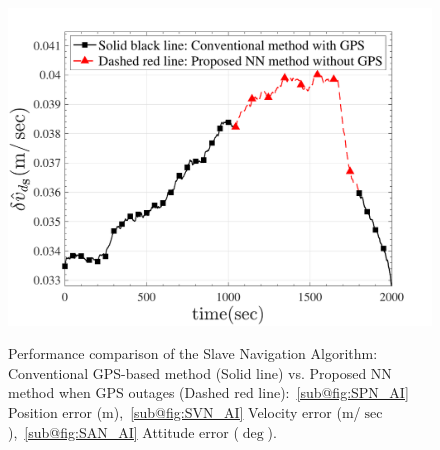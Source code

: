 \documentclass[3p]{elsarticle}
\begin{document}
\begin{figure}[H]
{{	{\includegraphics[width=.33\textwidth]{../Figure/AI-results/Slave/Down velocity errorAI}}}
	}\\
	\caption{%
Performance comparison of the Slave Navigation Algorithm: Conventional GPS-based method (Solid line) vs. Proposed NN method when GPS outages (Dashed red line):~\ref{sub@fig:SPN_AI} Position error (m),~\ref{sub@fig:SVN_AI} Velocity error (m/\(\sec\)),~\ref{sub@fig:SAN_AI} Attitude error (\(\deg\)).
}

	\label{fig:AI_slave}
\end{figure}
\end{document}
